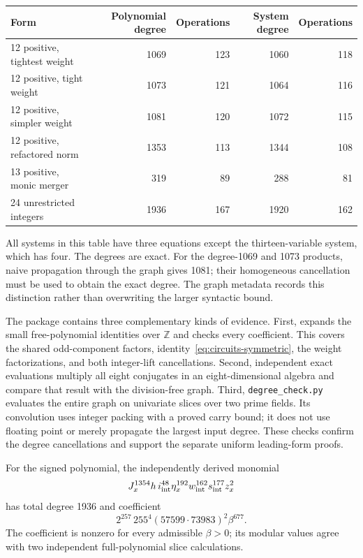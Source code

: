 \documentclass[11pt,letterpaper]{article}
\newcommand{\Z}{\mathbb Z}
\theoremstyle{remark}
\begin{document}
\begin{center}
\small
\begin{tabular}{lrrrr}
\hline
Form & Polynomial degree & Operations & System degree & Operations\\
\hline
12 positive, tightest weight &1069&123&1060&118\\
12 positive, tight weight    &1073&121&1064&116\\
12 positive, simpler weight &1081&120&1072&115\\
12 positive, refactored norm&1353&113&1344&108\\
13 positive, monic merger   &319&89&288&81\\
24 unrestricted integers    &1936&167&1920&162\\
\hline
\end{tabular}
\end{center}
All systems in this table have three equations except the thirteen-variable
system, which has four. The degrees are exact. For the degree-1069 and
1073 products, naive propagation through the graph gives 1081; their
homogeneous cancellation must be used to obtain the exact degree.
The graph metadata records this distinction rather than overwriting the
larger syntactic bound.

The package contains three complementary kinds of evidence. First,
 expands the small free-polynomial
identities over $\Z$ and checks every coefficient. This covers the shared
odd-component factors, identity~\eqref{eq:circuits-symmetric}, the weight
factorizations, and both integer-lift cancellations. Second, independent
exact evaluations multiply all eight conjugates in an eight-dimensional
algebra and compare that result with the division-free graph. Third,
\texttt{degree\_check.py} evaluates the entire graph on univariate slices
over two prime fields. Its convolution uses integer packing with a proved
carry bound; it does not use floating point or merely propagate the
largest input degree. These checks confirm the degree cancellations and
support the separate uniform leading-form proofs.

For the signed polynomial, the independently derived monomial
\[
 J_x^{1354}h\,i_{\rm int}^{48}\eta_x^{192}
 w_{\rm int}^{162}s_{\rm int}^{177}z_x^2
\]
has total degree 1936 and coefficient
\[
 2^{257}\,255^4(57599\cdot73983)^2\beta^{677}.
\]
The coefficient is nonzero for every admissible $\beta>0$; its modular
values agree with two independent full-polynomial slice calculations.
\end{document}
